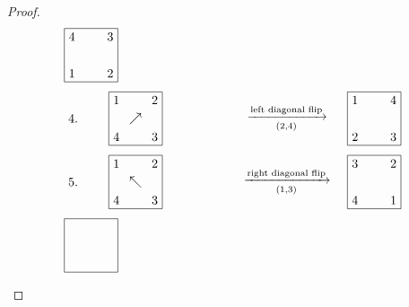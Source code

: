 \documentclass[12pt,reqno]{article}
\theoremstyle{plain}
\theoremstyle{definition}
\begin{document}
\begin{proof}
\begin{align*}
\begin{tikzpicture}
        \end{tikzpicture}
        &\begin{tikzpicture}
            \draw (0,0) -- (0,1.5) -- (1.5,1.5) -- (1.5,0) -- (0,0);
            \node[below right] at (0,1.5) {4};
            \node[below left] at (1.5,1.5) {3};
            \node[above left] at (1.5,0) {2};
            \node[above right] at (0,0) {1};
        \end{tikzpicture}
        \\
        &\begin{tikzpicture}
            \draw (0,0) -- (0,1.5) -- (1.5,1.5) -- (1.5,0) -- (0,0);
            \node at (-1, 0.75) {4.};
            \node[below right] at (0,1.5) {1};
            \node[below left] at (1.5,1.5) {2};
            \node[above left] at (1.5,0) {3};
            \node[above right] at (0,0) {4};
            \node at (0.75,0.75) {\(\nearrow\)};
            \node at (5,0.75) {\(\xrightarrow[(2,4)]{\text{left diagonal flip}}\)};
        \end{tikzpicture}
        &\begin{tikzpicture}
            \draw (0,0) -- (0,1.5) -- (1.5,1.5) -- (1.5,0) -- (0,0);
            \node[below right] at (0,1.5) {1};
            \node[below left] at (1.5,1.5) {4};
            \node[above left] at (1.5,0) {3};
            \node[above right] at (0,0) {2};
        \end{tikzpicture}
        \\
        &\begin{tikzpicture}
            \draw (0,0) -- (0,1.5) -- (1.5,1.5) -- (1.5,0) -- (0,0);
            \node at (-1, 0.75) {5.};
            \node[below right] at (0,1.5) {1};
            \node[below left] at (1.5,1.5) {2};
            \node[above left] at (1.5,0) {3};
            \node[above right] at (0,0) {4};
            \node at (0.75,0.75) {\(\nwarrow\)};
            \node at (5,0.75) {\(\xrightarrow[(1,3)]{\text{right diagonal flip}}\)};
        \end{tikzpicture}
        &\begin{tikzpicture}
            \draw (0,0) -- (0,1.5) -- (1.5,1.5) -- (1.5,0) -- (0,0);
            \node[below right] at (0,1.5) {3};
            \node[below left] at (1.5,1.5) {2};
            \node[above left] at (1.5,0) {1};
            \node[above right] at (0,0) {4};
        \end{tikzpicture}
        \\
        &\begin{tikzpicture}
            \draw (0,0) -- (0,1.5) -- (1.5,1.5) -- (1.5,0) -- (0,0);

\end{tikzpicture}
\end{align*}
\end{proof}
\end{document}
